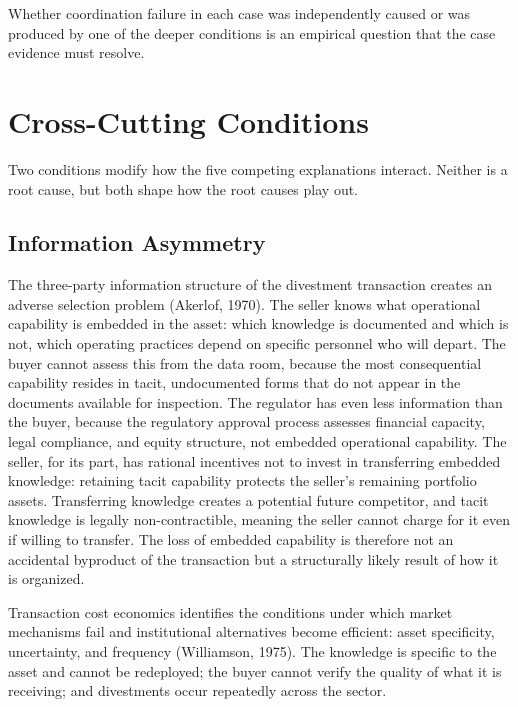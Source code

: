 \documentclass[twoside,fontset=lmodern]{mitthesis}
\begin{document}
Whether coordination failure in each case was independently caused or
was produced by one of the deeper conditions is an empirical question
that the case evidence must resolve.

\hypertarget{cross-cutting-conditions}{%
\section{Cross-Cutting Conditions}\label{cross-cutting-conditions}}

Two conditions modify how the five competing explanations interact.
Neither is a root cause, but both shape how the root causes play out.

\hypertarget{information-asymmetry}{%
\subsection{Information Asymmetry}\label{information-asymmetry}}

The three-party information structure of the divestment transaction
creates an adverse selection problem (Akerlof, 1970). The seller knows
what operational capability is embedded in the asset: which knowledge is
documented and which is not, which operating practices depend on
specific personnel who will depart. The buyer cannot assess this from
the data room, because the most consequential capability resides in
tacit, undocumented forms that do not appear in the documents available
for inspection. The regulator has even less information than the buyer,
because the regulatory approval process assesses financial capacity,
legal compliance, and equity structure, not embedded operational
capability. The seller, for its part, has rational incentives not to
invest in transferring embedded knowledge: retaining tacit capability
protects the seller's remaining portfolio assets. Transferring knowledge
creates a potential future competitor, and tacit knowledge is legally
non-contractible, meaning the seller cannot charge for it even if
willing to transfer. The loss of embedded capability is therefore not an
accidental byproduct of the transaction but a structurally likely result
of how it is organized.

Transaction cost economics identifies the conditions under which market
mechanisms fail and institutional alternatives become efficient: asset
specificity, uncertainty, and frequency (Williamson, 1975). The
knowledge is specific to the asset and cannot be redeployed; the buyer
cannot verify the quality of what it is receiving; and divestments occur
repeatedly across the sector.
\end{document}
